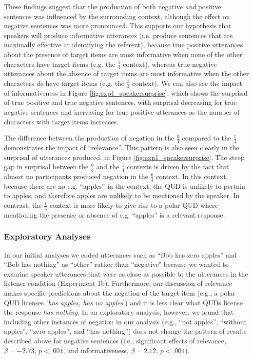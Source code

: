 \documentclass[man, floatsintext, noapacite]{apa6}
\begin{document}
These findings suggest that the production of both negative \textit{and} positive sentences was influenced by the surrounding context, although the effect on negative sentences was more pronounced. This supports our hypothesis that speakers will produce informative utterances (i.e. produce sentences that are maximally effective at identifying the referent), because true positive utterances about the presence of target items are most informative when none of the other characters have target items (e.g. the $\frac{1}{4}$ context), whereas true negative utterances about the absence of target items are most informative when the other characters \textit{do} have target items (e.g. the $\frac{3}{4}$ context). We can also see the impact of informativeness in Figure \ref{fig:exp1_speakersurprise}, which shows the surprisal of true positive and true negative sentences, with surprisal decreasing for true negative sentences and increasing for true positive utterances as the number of characters with target items increases. 

The difference between the production of negation in the $\frac{0}{4}$ compared to the  $\frac{1}{4}$ demonstrates the impact of ``relevance''. This pattern is also seen clearly in the surprisal of utterances produced, in Figure \ref{fig:exp1_speakersurprise}. The steep gap in surprisal between the  $\frac{0}{4}$ and the  $\frac{1}{4}$ contexts is driven by the fact that almost no participants produced negation in the  $\frac{0}{4}$ context. In this context, because there are no e.g. ``apples'' in the context, the QUD is unlikely to pertain to apples, and therefore apples are unlikely to be mentioned by the speaker. In contrast, the $\frac{1}{4}$ context is more likely to give rise to a polar QUD where mentioning the presence or absence of e.g. ``apples'' is a relevant response. 

\subsubsection{Exploratory Analyses}

In our initial analyses we coded utterances such as ``Bob has zero apples'' and ``Bob has nothing'' as ``other'' rather than ``negative" because we wanted to examine speaker utterances that were as close as possible to the utterances in the listener condition (Experiment 1b). Furthermore, our discussion of relevance makes specific predictions about the negation of the target item (e.g., a polar QUD licenses [\textit{has apples, has no apples}]) and it is less clear what QUDs license the response \textit{has nothing}. In an exploratory analysis, however, we found that including other instances of negation in our analysis (e.g., ``not apples'', ``without apples'', ``zero apples'', and ``has nothing'') does not change the pattern of results described above for negative sentences (i.e., significant effects of relevance, $\beta= -2.73$, $p< .001$, and informativeness, $\beta= 2.12$, $p< .001$). 
\end{document}
